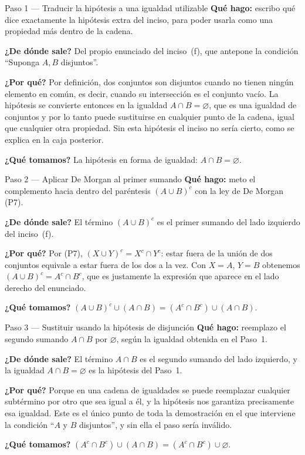 \documentclass[11pt]{article}
\begin{document}
\begin{paso}{Paso 1 --- Traducir la hipótesis a una igualdad utilizable}
\textbf{Qué hago:} escribo qué dice exactamente la hipótesis extra del inciso, para poder usarla
como una propiedad más dentro de la cadena.

\textbf{¿De dónde sale?} Del propio enunciado del inciso~(f), que antepone la condición
``Suponga $A,B$ disjuntos''.

\textbf{¿Por qué?} Por definición, dos conjuntos son disjuntos cuando no tienen ningún elemento
en común, es decir, cuando su intersección es el conjunto vacío. La hipótesis se convierte
entonces en la igualdad $A\cap B=\varnothing$, que es una igualdad de conjuntos y por lo tanto
puede sustituirse en cualquier punto de la cadena, igual que cualquier otra propiedad. Sin esta
hipótesis el inciso no sería cierto, como se explica en la caja posterior.

\textbf{¿Qué tomamos?} La hipótesis en forma de igualdad: $A\cap B=\varnothing$.
\end{paso}

\begin{paso}{Paso 2 --- Aplicar De Morgan al primer sumando}
\textbf{Qué hago:} meto el complemento hacia dentro del paréntesis $(A\cup B)^{c}$ con la ley de
De Morgan (P7).

\textbf{¿De dónde sale?} El término $(A\cup B)^{c}$ es el primer sumando del lado izquierdo del
inciso~(f).

\textbf{¿Por qué?} Por (P7), $(X\cup Y)^{c}=X^{c}\cap Y^{c}$: estar fuera de la unión de dos
conjuntos equivale a estar fuera de los dos a la vez. Con $X=A$, $Y=B$ obtenemos
$(A\cup B)^{c}=A^{c}\cap B^{c}$, que es justamente la expresión que aparece en el lado derecho
del enunciado.

\textbf{¿Qué tomamos?} $(A\cup B)^{c}\cup(A\cap B)=(A^{c}\cap B^{c})\cup(A\cap B)$.
\end{paso}

\begin{paso}{Paso 3 --- Sustituir usando la hipótesis de disjunción}
\textbf{Qué hago:} reemplazo el segundo sumando $A\cap B$ por $\varnothing$, según la igualdad
obtenida en el Paso~1.

\textbf{¿De dónde sale?} El término $A\cap B$ es el segundo sumando del lado izquierdo, y la
igualdad $A\cap B=\varnothing$ es la hipótesis del Paso~1.

\textbf{¿Por qué?} Porque en una cadena de igualdades se puede reemplazar cualquier subtérmino
por otro que sea igual a él, y la hipótesis nos garantiza precisamente esa igualdad. Este es el
único punto de toda la demostración en el que interviene la condición ``$A$ y $B$ disjuntos'', y
sin ella el paso sería inválido.

\textbf{¿Qué tomamos?} $(A^{c}\cap B^{c})\cup(A\cap B)=(A^{c}\cap B^{c})\cup\varnothing$.
\end{paso}
\end{document}
